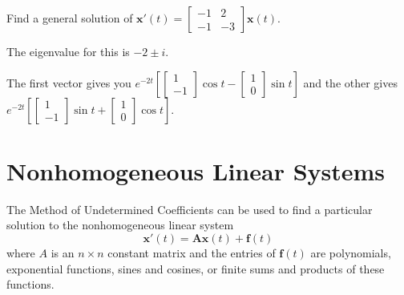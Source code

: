 \documentclass[../diffeq.tex]{subfiles}
\begin{document}
\begin{example}
    Find a general solution of $\textbf{x}'(t)=\begin{bmatrix}
        -1 & 2\\
        -1 & -3
    \end{bmatrix}\textbf{x}(t)$.

    The eigenvalue for this is $-2\pm i$.

    The first vector gives you $e^{-2t}[\begin{bmatrix}
        1\\-1
    \end{bmatrix}\cos t - \begin{bmatrix}
        1\\0
    \end{bmatrix}\sin t]$ and the other gives $e^{-2t}[\begin{bmatrix}
        1\\-1
    \end{bmatrix}\sin t + \begin{bmatrix}
        1 \\ 0
    \end{bmatrix}\cos t]$.
\end{example}

\section{Nonhomogeneous Linear Systems}
The Method of Undetermined Coefficients can be used to find a particular solution to the nonhomogeneous linear system 
\[ \textbf{x}'(t)=\textbf{Ax}(t)+\textbf{f}(t) \]
where $A$ is an $n\times n$ constant matrix and the entries of $\textbf{f}(t)$ are polynomials, exponential functions, sines and cosines, or finite sums and products of these functions.
\end{document}
